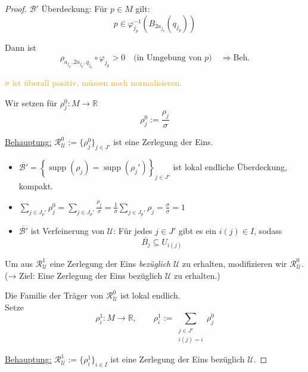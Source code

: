 \documentclass[fleqn, 12pt, letterpaper]{article}
\begin{document}
\begin{proof}
$\mathcal{B}'$ Überdeckung: Für $p \in M$ gilt:
\[
p \in \varphi_{j_p}^{-1}(B_{2a_{j_p}}(q_{j_p}))
\]

Dann ist
\[
\rho_{a_{j_p}, 2a_{j_p}, q_{j_p}} \circ \varphi_{j_p} > 0 \quad \text{(in Umgebung von $p$)}
\quad \Rightarrow \text{Beh.}
\]

\medskip

\textcolor{orange}{\small $\sigma$ ist überall positiv, müssen noch normalisieren.}

\medskip

Wir setzen für $\rho_j^0 \colon M \to \mathbb{R}$
\[
\rho_j^0 := \frac{\rho_j}{\sigma}
\]

\underline{Behauptung:} $\mathcal{R}_{\mathcal{U}}^0 := \{\rho_j^0\}_{j \in J'}$ ist eine Zerlegung der Eins.

\begin{itemize}
    \item $\overline{\mathcal{B}'} = \left\{ \operatorname{supp}(\rho_j) = \operatorname{supp}(\rho_j') \right\}_{j \in J'}$ ist lokal endliche Überdeckung, kompakt.
    
    \item 
    \(
    \sum_{j \in J_p'} \rho_j^0 = \sum_{j \in J_p'} \frac{\rho_j}{\sigma} = \frac{1}{\sigma} \sum_{j \in J_p'} \rho_j = \frac{\sigma}{\sigma} = 1
    \)
    
    \item $\overline{\mathcal{B}'}$ ist Verfeinerung von $\mathcal{U}$: Für jedes $j \in J'$ gibt es ein $i(j) \in I$, sodass
    \[
    \overline{B_j} \subseteq U_{i(j)}
    \]
\end{itemize}

Um aus $\mathcal{R}_{\mathcal{U}}^1$ eine Zerlegung der Eins \emph{bezüglich} $\mathcal{U}$ zu erhalten, modifizieren wir $\mathcal{R}_{\mathcal{U}}^0$.\\
(→ Ziel: Eine Zerlegung der Eins bezüglich $\mathcal{U}$ zu erhalten.)

\medskip

Die Familie der Träger von $\mathcal{R}_{\mathcal{U}}^0$ ist lokal endlich.\\

Setze
\[
\rho_i^1 \colon M \to \mathbb{R}, \qquad \rho_i^1 := \sum_{\substack{j \in J' \\ i(j) = i}} \rho_j^0
\]

\underline{Behauptung:} $\mathcal{R}_{\mathcal{U}}^1 := \{ \rho_i^1 \}_{i \in I}$ ist eine Zerlegung der Eins bezüglich $\mathcal{U}$.

\medskip


\end{proof}
\end{document}
